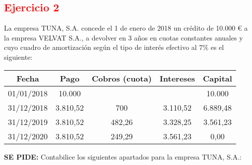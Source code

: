 \newpage 
\subsection*{\textcolor{red}{\textbf{Ejercicio 2}}}
La empresa TUNA, S.A. concede el 1 de enero de 2018 un crédito de 10.000 € a la empresa VELVAT S.A., a devolver en 3 años en cuotas constantes anuales y cuyo cuadro de amortización según el tipo de interés efectivo al 7\% es el siguiente:

\begin{table}[H]
\centering
\begin{tabular}{|c|c|c|c|c|}
    \hline
    Fecha & Pago & Cobros (cuota) & Intereses & Capital \\
    \hline
    01/01/2018 & 10.000 & & & 10.000 \\
    \hline
    31/12/2018 & 3.810,52 & 700 & 3.110,52 & 6.889,48 \\
    \hline
    31/12/2019 & 3.810,52 & 482,26 & 3.328,25 & 3.561,23 \\
    \hline
    31/12/2020 & 3.810,52 & 249,29 & 3.561,23 & 0,00 \\
    \hline
\end{tabular}
\end{table}

\textbf{SE PIDE:} Contabilice los siguientes apartados para la empresa TUNA, S.A.:

